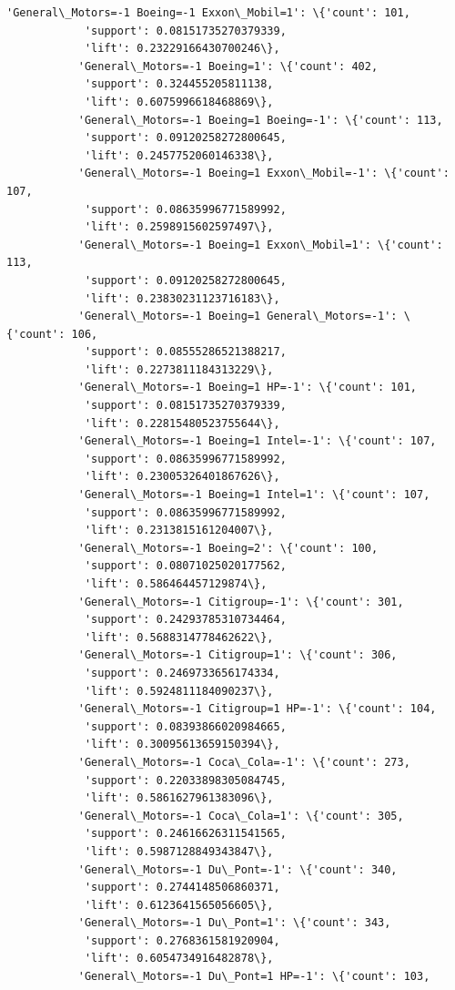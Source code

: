 \documentclass[11pt]{article}
\begin{document}
\begin{Verbatim}[commandchars=\\\{\}]
           'General\_Motors=-1 Boeing=-1 Exxon\_Mobil=1': \{'count': 101,
            'support': 0.08151735270379339,
            'lift': 0.23229166430700246\},
           'General\_Motors=-1 Boeing=1': \{'count': 402,
            'support': 0.324455205811138,
            'lift': 0.6075996618468869\},
           'General\_Motors=-1 Boeing=1 Boeing=-1': \{'count': 113,
            'support': 0.09120258272800645,
            'lift': 0.2457752060146338\},
           'General\_Motors=-1 Boeing=1 Exxon\_Mobil=-1': \{'count': 107,
            'support': 0.08635996771589992,
            'lift': 0.2598915602597497\},
           'General\_Motors=-1 Boeing=1 Exxon\_Mobil=1': \{'count': 113,
            'support': 0.09120258272800645,
            'lift': 0.23830231123716183\},
           'General\_Motors=-1 Boeing=1 General\_Motors=-1': \{'count': 106,
            'support': 0.08555286521388217,
            'lift': 0.2273811184313229\},
           'General\_Motors=-1 Boeing=1 HP=-1': \{'count': 101,
            'support': 0.08151735270379339,
            'lift': 0.22815480523755644\},
           'General\_Motors=-1 Boeing=1 Intel=-1': \{'count': 107,
            'support': 0.08635996771589992,
            'lift': 0.23005326401867626\},
           'General\_Motors=-1 Boeing=1 Intel=1': \{'count': 107,
            'support': 0.08635996771589992,
            'lift': 0.2313815161204007\},
           'General\_Motors=-1 Boeing=2': \{'count': 100,
            'support': 0.08071025020177562,
            'lift': 0.586464457129874\},
           'General\_Motors=-1 Citigroup=-1': \{'count': 301,
            'support': 0.24293785310734464,
            'lift': 0.5688314778462622\},
           'General\_Motors=-1 Citigroup=1': \{'count': 306,
            'support': 0.2469733656174334,
            'lift': 0.5924811184090237\},
           'General\_Motors=-1 Citigroup=1 HP=-1': \{'count': 104,
            'support': 0.08393866020984665,
            'lift': 0.30095613659150394\},
           'General\_Motors=-1 Coca\_Cola=-1': \{'count': 273,
            'support': 0.22033898305084745,
            'lift': 0.5861627961383096\},
           'General\_Motors=-1 Coca\_Cola=1': \{'count': 305,
            'support': 0.24616626311541565,
            'lift': 0.5987128849343847\},
           'General\_Motors=-1 Du\_Pont=-1': \{'count': 340,
            'support': 0.2744148506860371,
            'lift': 0.6123641565056605\},
           'General\_Motors=-1 Du\_Pont=1': \{'count': 343,
            'support': 0.2768361581920904,
            'lift': 0.6054734916482878\},
           'General\_Motors=-1 Du\_Pont=1 HP=-1': \{'count': 103,

\end{Verbatim}
\end{document}
